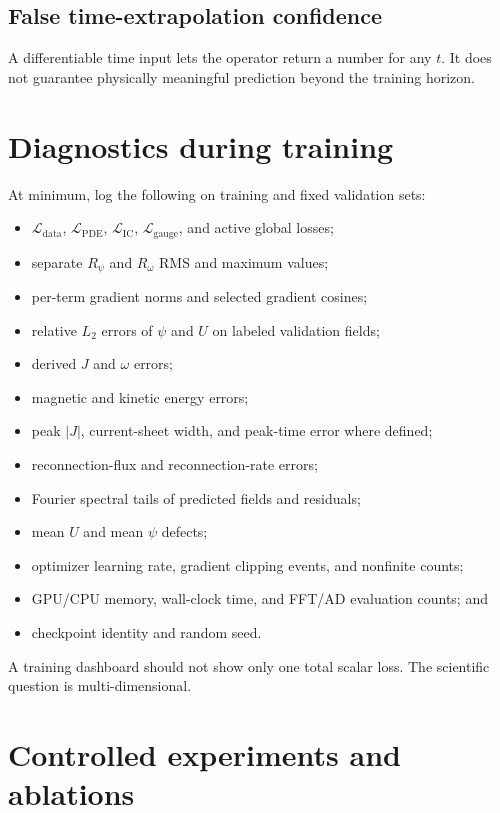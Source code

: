 \documentclass[11pt]{article}
\newcommand{\Ldata}{\mathcal{L}_{\mathrm{data}}}
\newcommand{\Lpde}{\mathcal{L}_{\mathrm{PDE}}}
\newcommand{\Lic}{\mathcal{L}_{\mathrm{IC}}}
\newcommand{\Lgauge}{\mathcal{L}_{\mathrm{gauge}}}
\begin{document}
\subsection{False time-extrapolation confidence}
A differentiable time input lets the operator return a number for any $t$. It does not guarantee physically meaningful prediction beyond the training horizon.

\section{Diagnostics during training}
\label{sec:diagnostics}

At minimum, log the following on training and fixed validation sets:
\begin{itemize}
  \item $\Ldata$, $\Lpde$, $\Lic$, $\Lgauge$, and active global losses;
  \item separate $R_\psi$ and $R_\omega$ RMS and maximum values;
  \item per-term gradient norms and selected gradient cosines;
  \item relative $L_2$ errors of $\psi$ and $U$ on labeled validation fields;
  \item derived $J$ and $\omega$ errors;
  \item magnetic and kinetic energy errors;
  \item peak $|J|$, current-sheet width, and peak-time error where defined;
  \item reconnection-flux and reconnection-rate errors;
  \item Fourier spectral tails of predicted fields and residuals;
  \item mean $U$ and mean $\psi$ defects;
  \item optimizer learning rate, gradient clipping events, and nonfinite counts;
  \item GPU/CPU memory, wall-clock time, and FFT/AD evaluation counts; and
  \item checkpoint identity and random seed.
\end{itemize}

A training dashboard should not show only one total scalar loss. The scientific question is multi-dimensional.

\section{Controlled experiments and ablations}
\label{sec:experiments}
\end{document}
